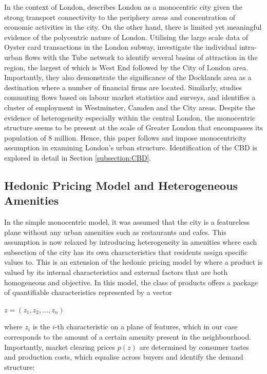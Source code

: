 \documentclass{article}
\begin{document}
In the context of London, \citet{EuropeanCommission1999ESDP:Union} describes London as a monocentric city given the strong transport connectivity to the periphery areas and concentration of economic activities in the city. On the other hand, there is limited yet meaningful evidence of the polycentric nature of London. Utilising the large scale data of Oyster card transactions in the London subway, \citet{Roth2011StructureFlows} investigate the individual intra-urban flows with the Tube network to identify several basins of attraction in the region, the largest of which is West End followed by the City of London area. Importantly, they also demonstrate the significance of the Docklands area as a destination where a number of financial firms are located. Similarly, \citet{Park2011SpatialAngeles} studies commuting flows based on labour market statistics and surveys, and identifies a cluster of employment in Westminster, Camden and the City areas. Despite the evidence of heterogeneity especially within the central London, the monocentric structure seems to be present at the scale of Greater London that encompasses its population of 8 million. Hence, this paper follows \citet{Park2011SpatialAngeles} and impose monocentricity assumption \citep{AlonsoWilliam1964Lalu} in examining London's urban structure. Identification of the CBD is explored in detail in Section \ref{subsection:CBD}.

\subsection{Hedonic Pricing Model and Heterogeneous Amenities} \label{subsection:hedonic} 
In the simple monocentric model, it was assumed that the city is a featureless plane without any urban amenities such as restaurants and cafes. This assumption is now relaxed by introducing heterogeneity in amenities where each subsection of the city has its own characteristics that residents assign specific values to. This is an extension of the hedonic pricing model by \citet{Rosen1984} where a product is valued by its internal characteristics and external factors that are both homogeneous and objective. In this model, the class of products offers a package of quantifiable characteristics represented by a vector 

\begin{center}
    $z = \left( z _ { 1 } , z _ { 2 } , \dots , z _ { n } \right)$
\end{center}

where $z_i$ is the $i$-th characteristic on a plane of features, which in our case corresponds to the amount of a certain amenity present in the neighbourhood. Importantly, market clearing prices $p(z)$ are determined by consumer tastes and production costs, which equalise across buyers and identify the demand structure:
\end{document}
